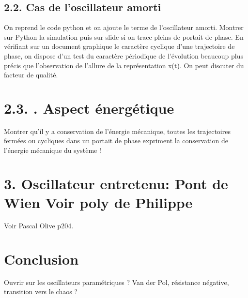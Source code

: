 \documentclass[french, a4paper, 10pt, twocolumn, landscape]{article}
\begin{document}
\subsection*{2.2. Cas de l'oscillateur amorti}

On reprend le code python et on ajoute le terme de l'oscillateur amorti.
Montrer sur Python la simulation puis sur slide si on trace pleins de portait de
phase. En vérifiant sur un document graphique le caractère cyclique d’une trajectoire de
phase, on dispose d’un test du caractère périodique de l’évolution beaucoup plus
précis que l’observation de l’allure de la représentation x(t). On peut discuter du facteur de qualité.

\section*{2.3. . Aspect énergétique}

Montrer qu'il y a conservation de l'énergie mécanique, toutes les trajectoires fermées ou cycliques dans un portait de phase expriment la conservation de l'énergie mécanique du système !\\

\section*{3. Oscillateur entretenu: Pont de Wien Voir poly de Philippe}

  Voir Pascal Olive p204.
  
  \section*{Conclusion}
  Ouvrir sur les oscillateurs paramétriques ? Van der Pol, résistance négative, transition vers le chaos ?

  
\end{document}
